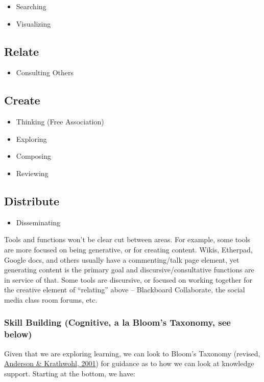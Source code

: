 \begin{itemize}
\item
  Searching
\item
  Visualizing
\end{itemize}

\subsection{Relate}

\begin{itemize}
\item
  Consulting Others
\end{itemize}

\subsection{Create}

\begin{itemize}
\item
  Thinking (Free Association)
\item
  Exploring
\item
  Composing
\item
  Reviewing
\end{itemize}

\subsection{Distribute}

\begin{itemize}
\item
  Disseminating
\end{itemize}

Tools and functions won't be clear cut between areas. For example, some
tools are more focused on being generative, or for creating content.
Wikis, Etherpad, Google docs, and others usually have a commenting/talk
page element, yet generating content is the primary goal and
discursive/consultative functions are in service of that. Some tools are
discursive, or focused on working together for the creative element of
``relating'' above -- Blackboard Collaborate, the social media class
room forums, etc.

\subsubsection{Skill Building (Cognitive, a la Bloom's Taxonomy, see
below)}

Given that we are exploring learning, we can look to Bloom's Taxonomy
(revised, \hyperref[anderson]{Anderson \& Krathwohl, 2001}) for guidance
as to how we can look at knowledge support. Starting at the bottom, we
have:

